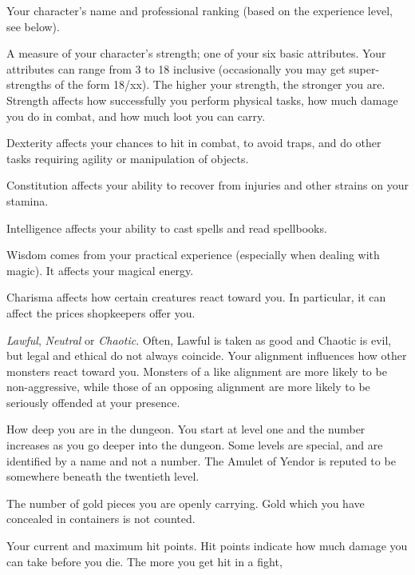 \blist{}
\item[\bb{Rank}]
Your character's name and professional ranking (based on the
experience level, see below).
\item[\bb{Strength}]
A measure of your character's strength; one of your six basic
attributes.  Your attributes can range from 3 to 18 inclusive
(occasionally you may get super-strengths of the form 18/xx).  The
higher your strength, the stronger you are.  Strength affects how
successfully you perform physical tasks, how much damage you do in
combat, and how much loot you can carry.
\item[\bb{Dexterity}]
Dexterity affects your chances to hit in combat, to avoid traps, and
do other tasks requiring agility or manipulation of objects.
\item[\bb{Constitution}]
Constitution affects your ability to recover from injuries and other
strains on your stamina.
\item[\bb{Intelligence}]
Intelligence affects your ability to cast spells and read spellbooks.
\item[\bb{Wisdom}]
Wisdom comes from your practical experience (especially when dealing with
magic).  It affects your magical energy.
\item[\bb{Charisma}]
Charisma affects how certain creatures react toward you.  In
particular, it can affect the prices shopkeepers offer you.
\item[\bb{Alignment}]
%
{\it Lawful}, {\it Neutral\/} or {\it Chaotic}.  Often, Lawful is
taken as good and Chaotic is evil, but legal and ethical do not always
coincide.  Your alignment influences how other
monsters react toward you.  Monsters of a like alignment are more likely
to be non-aggressive, while those of an opposing alignment are more likely
to be seriously offended at your presence.
\item[\bb{Dungeon Level}]
How deep you are in the dungeon.  You start at level one and the number
increases as you go deeper into the dungeon.  Some levels are special,
and are identified by a name and not a number.  The Amulet of Yendor is
reputed to be somewhere beneath the twentieth level.
\item[\bb{Gold}]
The number of gold pieces you are openly carrying.  Gold which you have
concealed in containers is not counted.
\item[\bb{Hit Points}]
Your current and maximum hit points.  Hit points indicate how much
damage you can take before you die.  The more you get hit in a fight,
